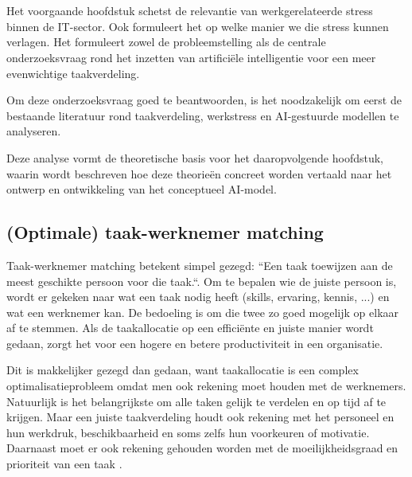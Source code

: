 \chapter{}%
\label{ch:literatuurstudie}



Het voorgaande hoofdstuk schetst de relevantie van werkgerelateerde stress binnen de IT-sector. Ook formuleert het op welke manier we die stress kunnen verlagen. Het formuleert zowel de probleemstelling als de centrale onderzoeksvraag rond het inzetten van artificiële intelligentie voor een meer evenwichtige taakverdeling.

Om deze onderzoeksvraag goed te beantwoorden, is het noodzakelijk om eerst de bestaande literatuur rond taakverdeling, werkstress en AI-gestuurde modellen te analyseren.

Deze analyse vormt de theoretische basis voor het daaropvolgende hoofdstuk, waarin wordt beschreven hoe deze theorieën concreet worden vertaald naar het ontwerp en ontwikkeling van het conceptueel AI-model.

\section{(Optimale) taak-werknemer matching}
\label{ch:optimale-taak-werknemer-matching} 
\vspace{1em}Taak-werknemer matching betekent simpel gezegd: ``Een taak toewijzen aan de meest geschikte persoon voor die taak.``. Om te bepalen wie de juiste persoon is, wordt er gekeken naar wat een taak nodig heeft (skills, ervaring, kennis, ...) en wat een werknemer kan. De bedoeling is om die twee zo goed mogelijk op elkaar af te stemmen. Als de taakallocatie op een efficiënte en juiste manier wordt gedaan, zorgt het voor een hogere en betere productiviteit in een organisatie.

Dit is makkelijker gezegd dan gedaan, want taakallocatie is een complex optimalisatieprobleem omdat men ook rekening moet houden met de werknemers. Natuurlijk is het belangrijkste om alle taken gelijk te verdelen en op tijd af te krijgen. Maar een juiste taakverdeling houdt ook rekening met het personeel en hun werkdruk, beschikbaarheid en soms zelfs hun voorkeuren of motivatie. Daarnaast moet er ook rekening gehouden worden met de moeilijkheidsgraad en prioriteit van een taak \autocite{Pratama_2023}.

